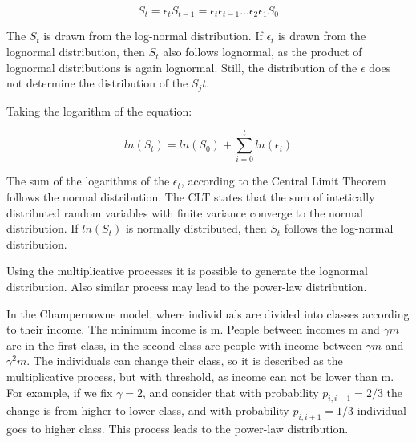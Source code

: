 $$S_t = \epsilon_t S_{t-1} = \epsilon_t \epsilon_{t-1}... \epsilon_2 \epsilon_1 S_{0} $$

The $S_t$ is drawn from the log-normal distribution. If $\epsilon_t$ is drawn from the lognormal distribution, then $S_t$ also follows lognormal, as the product of lognormal distributions is again lognormal. Still, the distribution of the $\epsilon$ does not determine the distribution of the $S_jt$. 

Taking the logarithm of the equation:

$$ln(S_t) = ln(S_0) + \sum_{i=0}^{t} ln(\epsilon_i)$$

The sum of the logarithms of the $\epsilon_t$, according to the Central Limit Theorem follows the normal distribution. The CLT states that the sum of intetically distributed random variables with finite variance converge to the normal distribution. If $ln(S_t)$ is normally distributed, then $S_t$ follows the log-normal distribution.   

Using the multiplicative processes it is possible to generate the lognormal distribution. Also similar process may lead to the power-law distribution. 

In the Champernowne model, where individuals are divided into classes according to their income. The minimum income is m. People between incomes m and $\gamma m$ are in the first class, in the second class are people with income between $\gamma m$ and $\gamma^2 m $. The individuals can change their class, so it is described as the multiplicative process, but with threshold, as income can not be lower than m. For example, if we fix $\gamma=2$, and consider that with probability $p_{i,i-1}=2/3$ the change is from higher to lower class, and with probability $p_{i, i+1}=1/3$ individual goes to higher class. This process leads to the power-law distribution.




